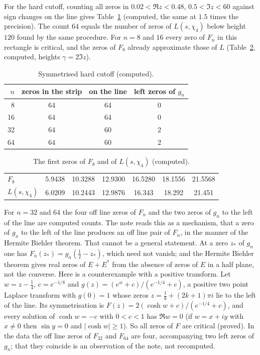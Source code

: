 For the hard cutoff, counting all zeros in $0.02<\Re z<0.48$, $0.5<\Im z<60$ against sign changes on the line gives Table~\ref{tr:tab:sym} (computed, the same at $1.5$ times the precision). The count $64$ equals the number of zeros of $L(s,\chi_4)$ below height $120$ found by the same procedure. For $n=8$ and $16$ every zero of $F_n$ in this rectangle is critical, and the zeros of $F_8$ already approximate those of $L$ (Table~\ref{tr:tab:F8}, computed, heights $\gamma=2\Im z$).

\begin{table}[h]\centering\small
\begin{tabular}{rccc}
\toprule
$n$ & zeros in the strip & on the line & left zeros of $g_n$\\
\midrule
8 & 64 & 64 & 0\\
16 & 64 & 64 & 0\\
32 & 64 & 60 & 2\\
64 & 64 & 60 & 2\\
\bottomrule
\end{tabular}
\caption{Symmetrised hard cutoff (computed).}\label{tr:tab:sym}
\end{table}

\begin{table}[h]\centering\small
\begin{tabular}{lcccccc}
\toprule
$F_8$ & 5.9438 & 10.3288 & 12.9300 & 16.5280 & 18.1556 & 21.5568\\
$L(s,\chi_4)$ & 6.0209 & 10.2443 & 12.9876 & 16.343 & 18.292 & 21.451\\
\bottomrule
\end{tabular}
\caption{The first zeros of $F_8$ and of $L(s,\chi_4)$ (computed).}\label{tr:tab:F8}
\end{table}

\begin{remark}\label{tr:rem:biehler}
For $n=32$ and $64$ the four off line zeros of $F_n$ and the two zeros of $g_n$ to the left of the line are computed counts. The note reads this as a mechanism, that a zero of $g_n$ to the left of the line produces an off line pair of $F_n$, in the manner of the Hermite Biehler theorem. That cannot be a general statement. At a zero $z_*$ of $g_n$ one has $F_n(z_*)=g_n(\frac12-z_*)$, which need not vanish; and the Hermite Biehler theorem gives real zeros of $E+E^*$ from the absence of zeros of $E$ in a half plane, not the converse. Here is a counterexample with a positive transform. Let $w=z-\frac14$, $c=e^{-1/8}$ and $g(z)=(e^w+c)/(e^{-1/4}+c)$, a positive two point Laplace transform with $g(0)=1$ whose zeros $z=\frac18+(2k+1)\pi i$ lie to the left of the line. Its symmetrisation is $F(z)=2(\cosh w+c)/(e^{-1/4}+c)$, and every solution of $\cosh w=-c$ with $0<c<1$ has $\Re w=0$ (if $w=x+iy$ with $x\ne0$ then $\sin y=0$ and $|\cosh w|\ge1$). So all zeros of $F$ are critical (proved). In the data the off line zeros of $F_{32}$ and $F_{64}$ are four, accompanying two left zeros of $g_n$; that they coincide is an observation of the note, not recomputed.
\end{remark}

